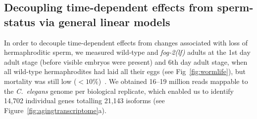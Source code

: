 \documentclass[9pt,twocolumn,twoside]{gsajnl}
\newcommand{\cel}{\emph{C.~elegans}}
\newcommand{\fog}{\emph{\mbox{fog-2(lf)}}}
\begin{document}
\subsection{Decoupling time-dependent effects from sperm-status via general
linear models}
\label{sub:Transcriptomics}
In order to decouple time-dependent effects from changes associated with loss
of hermaphroditic sperm, we measured wild-type and \fog{} adults at the 1st day
adult stage (before visible embryos were present) and 6th day adult stage, when
all wild-type hermaphrodites had laid all their eggs (see
Fig~\ref{fig:wormlife}), but mortality was still low
($<10\%$)~\citep{Stroustrup2013}.  We obtained 16--19 million reads mappable to
the \cel{} genome per biological replicate, which enabled us to identify
14,702 individual genes totalling 21,143 isoforms (see
Figure~\ref{fig:agingtranscriptome}a).
\end{document}
